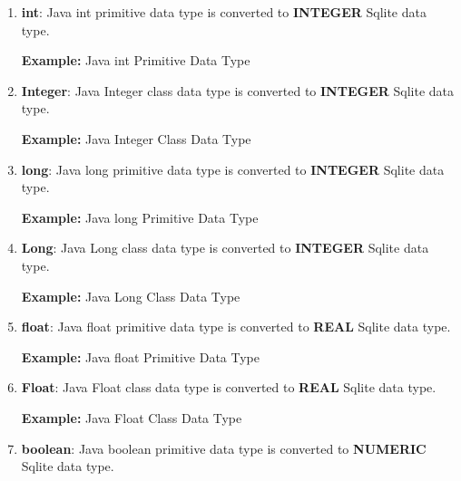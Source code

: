 \begin{enumerate}

	\item \small \textbf{int}: Java int primitive data type is converted to \textbf{INTEGER} Sqlite data type.

		\par
		\textbf{Example:} Java int  Primitive Data Type
			

	\item \small \textbf{Integer}: Java Integer class data type is converted to \textbf{INTEGER} Sqlite data type.

		\par
		\textbf{Example:} Java Integer Class Data Type
			

	\item \small \textbf{long}: Java long primitive data type is converted to \textbf{INTEGER} Sqlite data type.

		\par
		\textbf{Example:} Java long Primitive Data Type
			

	\item \small \textbf{Long}: Java Long class data type is converted to \textbf{INTEGER} Sqlite data type.

		\par
		\textbf{Example:} Java Long Class Data Type
			

	\item \small \textbf{float}: Java float primitive data type is converted to \textbf{REAL} Sqlite data type.

		\par
		\textbf{Example:} Java float Primitive Data Type
			

	\item \small \textbf{Float}: Java Float class data type is converted to \textbf{REAL} Sqlite data type.

		\par
		\textbf{Example:} Java Float Class Data Type
			

	\item \small \textbf{boolean}: Java boolean primitive data type is converted to \textbf{NUMERIC} Sqlite data type.


\end{enumerate}
